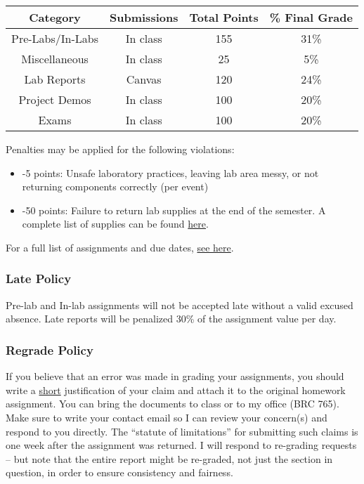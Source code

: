 \documentclass{article}
\begin{document}
\begin{table}[h!]
	\centering
\begin{tabular}[h!]{cccc}
\toprule
	Category & Submissions & Total Points & \% Final Grade\\
	\midrule
	Pre-Labs/In-Labs & In class & 155 & 31\%\\
	Miscellaneous & In class & 25 & 5\%\\
	Lab Reports & Canvas & 120 & 24\%\\
	Project Demos & In class & 100 & 20\%\\
	Exams & In class & 100 & 20\%\\
	\bottomrule
\end{tabular}
\end{table}

Penalties may be applied for the following violations:
\begin{itemize}
	\item -5 points: Unsafe laboratory practices, leaving lab area messy, or not returning components correctly (per event)
	\item -50 points: Failure to return lab supplies at the end of the semester. A complete list of supplies can be found \href{https://jameslong12.github.io/BIOE385/general_course_materials/supplies.pdf}{here}.
\end{itemize}

For a full list of assignments and due dates, \href{https://jameslong12.github.io/BIOE385/general_course_materials/assignments.pdf}{see here}.

\subsubsection*{Late Policy}
Pre-lab and In-lab assignments will not be accepted late without a valid excused absence. Late reports will be penalized 30\% of the assignment value per day.

\subsubsection*{Regrade Policy}
If you believe that an error was made in grading your assignments, you should write a \underline{short} justification of your claim and attach it to the original homework assignment. You can bring the documents to class or to my office (BRC 765).  Make sure to write your contact email so I can review your concern(s) and respond to you directly. The “statute of limitations” for submitting such claims is one week after the assignment was returned.  I will respond to re-grading requests – but note that the entire report might be re-graded, not just the section in question, in order to ensure consistency and fairness. 
\end{document}
